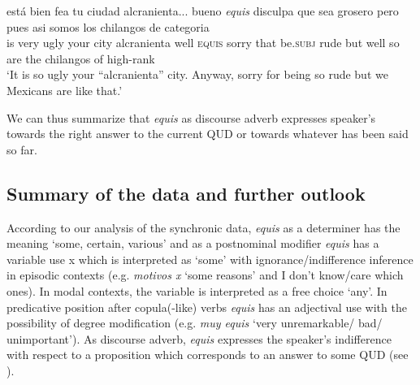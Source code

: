 \documentclass[output=paper]{langsci/langscibook}
\begin{document}
\ea
\gll está bien fea tu ciudad alcranienta... bueno \textit{equis} disculpa que sea grosero pero pues asi somos los chilangos de categoria\\
is very ugly your city alcranienta well \textsc{equis} sorry that be.\textsc{subj} rude but well so are the chilangos of high-rank\\
\glt ‘It is so ugly your “alcranienta” city. Anyway, sorry for being so rude but we Mexicans are like that.’
\z

We can thus summarize that \textit{equis} as discourse adverb expresses speaker’s towards the right answer to the current QUD or towards whatever has been said so far.

\subsection{Summary of the data and further outlook}\label{sec:kellert:2.5}
According to our analysis of the synchronic data, \textit{equis} as a determiner has the meaning ‘some, certain, various’ and as a postnominal modifier \textit{equis} has a variable use x which is interpreted as ‘some’ with ignorance/indifference inference in episodic contexts (e.g. \textit{motivos x} ‘some reasons’ and I don’t know/care which ones). In modal contexts, the variable is interpreted as a free choice ‘any’. In predicative position after copula(-like) verbs \textit{equis} has an adjectival use with the possibility of degree modification (e.g. \textit{muy equis} ‘very unremarkable/ bad/ unimportant’). As discourse adverb, \textit{equis} expresses the speaker’s indifference with respect to a proposition which corresponds to an answer to some QUD (see ).
\end{document}
